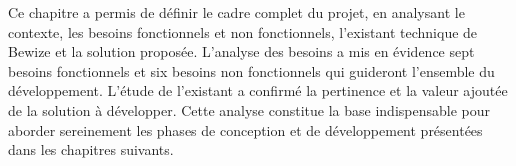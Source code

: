 Ce chapitre a permis de définir le cadre complet du projet, en analysant 
le contexte, les besoins fonctionnels et non fonctionnels, l'existant 
technique de Bewize et la solution proposée. L'analyse des besoins a 
mis en évidence sept besoins fonctionnels et six besoins non fonctionnels 
qui guideront l'ensemble du développement. L'étude de l'existant a 
confirmé la pertinence et la valeur ajoutée de la solution à développer. 
Cette analyse constitue la base indispensable pour aborder sereinement 
les phases de conception et de développement présentées dans les 
chapitres suivants.
